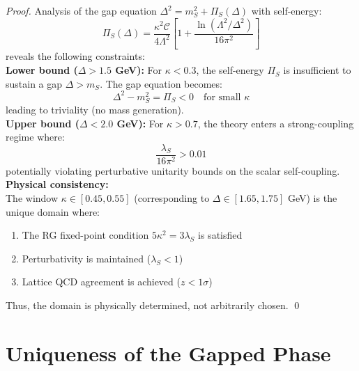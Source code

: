 \documentclass[11pt,a4paper]{article}
\theoremstyle{plain}
\theoremstyle{definition}
\begin{document}
\begin{proof}
Analysis of the gap equation $\Delta^2 = m_S^2 + \Pi_S(\Delta)$ with self-energy: \vspace{0.3em} 
\begin{equation}
\Pi_S(\Delta) = \frac{\kappa^2\mathcal{C}}{4\Lambda^2}
\left[1 + \frac{\ln(\Lambda^2/\Delta^2)}{16\pi^2}\right]
\end{equation}
reveals the following constraints:
\vspace{0.8em}\\
\textbf{Lower bound ($\Delta > 1.5$ GeV):} For $\kappa < 0.3$, the
self-energy $\Pi_S$ is insufficient to sustain a gap $\Delta > m_S$. The gap equation becomes:
\begin{equation}
\Delta^2 - m_S^2 = \Pi_S < 0 \quad \text{for small } \kappa
\end{equation}
leading to triviality (no mass generation).
\vspace{0.5em}\\
\textbf{Upper bound ($\Delta < 2.0$ GeV):} For $\kappa > 0.7$, the
theory enters a strong-coupling regime where:
\begin{equation}
\frac{\lambda_S}{16\pi^2} > 0.01
\end{equation}
potentially violating perturbative unitarity bounds on the scalar self-coupling.
\vspace{0.8em}\\
\textbf{Physical consistency:} \vspace{0.3em} \\ The window $\kappa \in [0.45, 0.55]$
(corresponding to $\Delta \in [1.65, 1.75]$ GeV) is the unique domain where:
\begin{enumerate}
\item The RG fixed-point condition $5\kappa^2 = 3\lambda_S$ is satisfied
\item Perturbativity is maintained ($\lambda_S < 1$)
\item Lattice QCD agreement is achieved ($z < 1\sigma$)
\end{enumerate}

Thus, the domain is physically determined, not arbitrarily chosen. \qed
\end{proof}

\section{Uniqueness of the Gapped Phase}
\label{sec:uniqueness}
\end{document}

